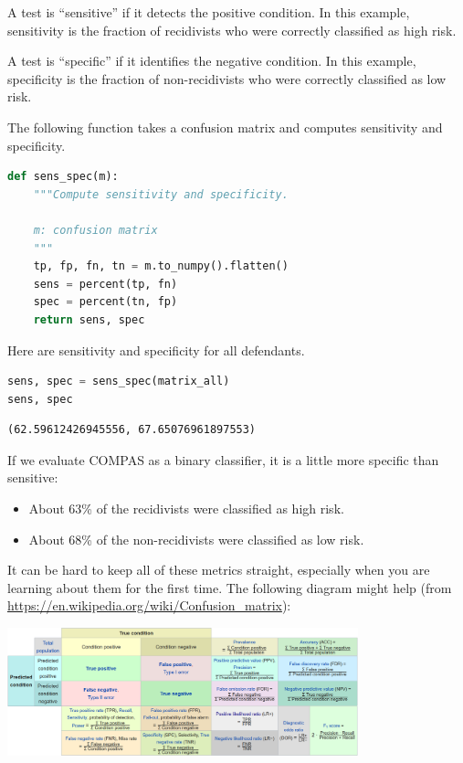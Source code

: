 A test is ``sensitive'' if it detects the positive condition. In this
example, sensitivity is the fraction of recidivists who were correctly
classified as high risk.

A test is ``specific'' if it identifies the negative condition. In this
example, specificity is the fraction of non-recidivists who were
correctly classified as low risk.

The following function takes a confusion matrix and computes sensitivity
and specificity.

\begin{lstlisting}[language=Python,style=source]
def sens_spec(m):
    """Compute sensitivity and specificity.
    
    m: confusion matrix
    """
    tp, fp, fn, tn = m.to_numpy().flatten()
    sens = percent(tp, fn)
    spec = percent(tn, fp)
    return sens, spec
\end{lstlisting}

Here are sensitivity and specificity for all defendants.

\begin{lstlisting}[language=Python,style=source]
sens, spec = sens_spec(matrix_all)
sens, spec
\end{lstlisting}

\begin{lstlisting}[style=output]
(62.59612426945556, 67.65076961897553)
\end{lstlisting}

If we evaluate COMPAS as a binary classifier, it is a little more
specific than sensitive:

\begin{itemize}
\item
  About 63\% of the recidivists were classified as high risk.
\item
  About 68\% of the non-recidivists were classified as low risk.
\end{itemize}

It can be hard to keep all of these metrics straight, especially when
you are learning about them for the first time. The following diagram
might help (from \url{https://en.wikipedia.org/wiki/Confusion_matrix}):

\includegraphics[width=4in]{figs/confusion_matrix2.png}

